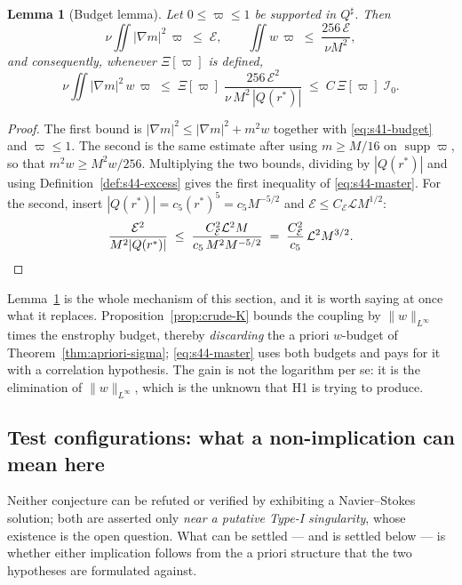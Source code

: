 \documentclass[11pt]{article}
\newtheorem{lemma}[theorem]{Lemma}
\theoremstyle{definition}
\theoremstyle{remark}
\begin{document}
\begin{lemma}[Budget lemma]\label{lem:s44-budget}
  Let $0\leq\varpi\leq1$ be supported in $Q^\sharp$. Then
  \[
    \nu\iint|\nabla m|^2\,\varpi \;\leq\;\mathcal{E},
    \qquad
    \iint w\,\varpi \;\leq\;\frac{256\,\mathcal{E}}{\nu M^2},
  \]
  and consequently, whenever $\Xi[\varpi]$ is defined,
  \begin{equation}\label{eq:s44-master}
    \nu\iint|\nabla m|^2\,w\,\varpi
    \;\leq\;
    \Xi[\varpi]\;\frac{256\,\mathcal{E}^2}{\nu\,M^2\,|Q(r^*)|}
    \;\leq\;
    C\,\Xi[\varpi]\;\mathcal{I}_0 .
  \end{equation}
\end{lemma}
\begin{proof}
  The first bound is $|\nabla m|^2\leq|\nabla m|^2+m^2w$ together with
  \eqref{eq:s41-budget} and $\varpi\leq1$. The second is the same estimate
  after using $m\geq M/16$ on $\operatorname{supp}\varpi$, so that
  $m^2w\geq M^2w/256$. Multiplying the two bounds, dividing by $|Q(r^*)|$ and
  using Definition~\ref{def:s44-excess} gives the first inequality of
  \eqref{eq:s44-master}. For the second, insert
  $|Q(r^*)|=c_5(r^*)^5=c_5M^{-5/2}$ and
  $\mathcal{E}\leq C_{\mathcal{E}}\mathcal{L}M^{1/2}$:
  \[
    \frac{\mathcal{E}^2}{M^2|Q(r^*)|}
    \;\leq\;\frac{C_{\mathcal{E}}^2\mathcal{L}^2M}{c_5\,M^{2}M^{-5/2}}
    \;=\;\frac{C_{\mathcal{E}}^2}{c_5}\,\mathcal{L}^2M^{3/2} . \qedhere
  \]
\end{proof}

Lemma~\ref{lem:s44-budget} is the whole mechanism of this section, and it is
worth saying at once what it replaces. Proposition~\ref{prop:crude-K} bounds
the coupling by $\|w\|_{L^\infty}$ times the enstrophy budget, thereby
\emph{discarding} the a priori $w$-budget of Theorem~\ref{thm:apriori-sigma};
\eqref{eq:s44-master} uses both budgets and pays for it with a correlation
hypothesis. The gain is not the logarithm per se: it is the elimination of
$\|w\|_{L^\infty}$, which is the unknown that H1 is trying to produce.

\subsection{Test configurations: what a non-implication can mean here}
\label{subsec:s44-config}

Neither conjecture can be refuted or verified by exhibiting a Navier--Stokes
solution; both are asserted only \emph{near a putative Type-I singularity},
whose existence is the open question. What can be settled --- and is settled
below --- is whether either implication follows from the a priori structure
that the two hypotheses are formulated against.
\end{document}
